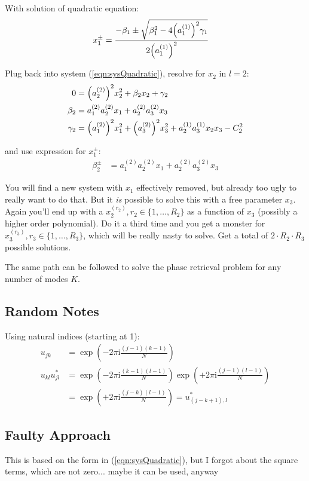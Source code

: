 \documentclass[
	english,
	a4paper,
	fontsize=10pt,
	parskip=half,
	titlepage=true,
	DIV=12,
	final
]{scrreprt}
\newcommand*{\iunit}{\ensuremath{\mathrm{i}}}
\begin{document}
With solution of quadratic equation:
\begin{align}
	x_1^{\pm}
&=
	\frac
		{-\beta_1 \pm \sqrt{\beta_1^2 - 4 \qty(a_1^{(1)})^2 \gamma_1}}
		{2 \qty(a_1^{(1)})^2}
\end{align}

Plug back into system (\ref{eqn:sysQuadratic}), resolve for $x_2$ in $l=2$:
\begin{align}
	0
&=
	\qty(a_2^{(2)})^2 x_2^2 +
	\beta_2 x_2 +
	\gamma_2
\\
	\beta_2
&=
	a_1^{(2)}a_2^{(2)} x_1 +
	a_2^{(2)}a_3^{(2)} x_3
\\
	\gamma_2
&=
	\qty(a_1^{(2)})^2 x_1^2 +
	\qty(a_3^{(2)})^2 x_3^2 +
	a_2^{(1)}a_3^{(1)} x_2 x_3 -
	C_2^2
\end{align}

and use expression for $x_1^{\pm}$:
\begin{align}
	\beta_2^\pm
&=
	a_1^{(2)}a_2^{(2)} x_1 +
	a_2^{(2)}a_3^{(2)} x_3
\end{align}

{\color{blue} You will find a new system with $x_1$ effectively removed, but already too ugly to really want to do that. But it \emph{is} possible to solve this with a free parameter $x_3$. Again you'll end up with a $x_2^{(r_2)}, r_2 \in \{1, \ldots, R_2\}$ as a function of $x_3$ (possibly a higher order polynomial). Do it a third time and you get a monster for $x_3^{(r_3)}, r_3 \in \{1, \ldots, R_3\}$, which will be really nasty to solve. Get a total of $2 \cdot R_2 \cdot R_3$ possible solutions.

The same path can be followed to solve the phase retrieval problem for any number of modes $K$.}



\subsection{Random Notes}
Using natural indices (starting at 1):
\begin{align}
	u_{jk}
&=
	\exp(-2\pi\iunit \frac{(j-1)(k-1)}{N})
\\
	u_{kl} u_{jl}^*
&=
	\exp(-2\pi\iunit \frac{(k-1)(l-1)}{N})  \exp(+2\pi\iunit \frac{(j-1)(l-1)}{N}) \\
&=
	\exp(+2\pi\iunit \frac{(j-k)(l-1)}{N})
=
	u_{(j-k+1), l}^*
\end{align}

\subsection{Faulty Approach}
{\color{red} This is based on the form in (\ref{eqn:sysQuadratic}), but I forgot about the square terms, which are not zero... maybe it can be used, anyway}
\end{document}
